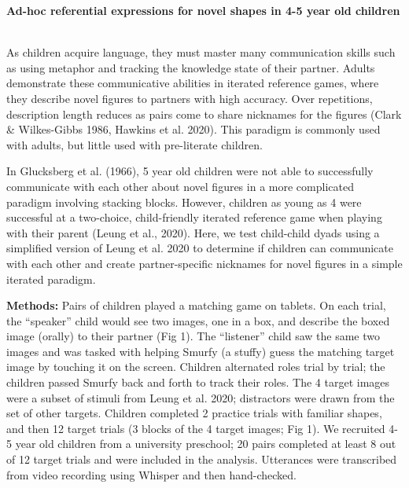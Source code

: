 \documentclass[11pt,a4paper]{article}
\renewcommand{\title}[1]{\textbf{#1}\\}
\newcommand{\authors}[1]{\iftoggle{anonymous}{\phantom{#1}}{#1}\\}
\newcommand{\email}[1]{\iftoggle{anonymous}{\phantom{#1}}{#1}}
\begin{document}


\title{Ad-hoc referential expressions for novel shapes in 4-5 year old children}
\authors{Veronica Boyce, Ilaria Chen, Bobby Sparks, Malia Perez, Michael C. Frank} 
\email{vboyce@stanford.edu;  Stanford University}
\newline
%




As children acquire language, they must master many communication skills such as using metaphor and tracking the knowledge state of their partner. Adults demonstrate these communicative abilities in iterated reference games, where they describe novel figures to partners with high accuracy. Over repetitions, description length reduces as pairs come to share nicknames for the figures (Clark \& Wilkes-Gibbs 1986, Hawkins et al. 2020). This paradigm is commonly used with adults, but little used with pre-literate children. 

In  Glucksberg et al. (1966), 5 year old children were not able to successfully communicate with each other about novel figures in a more complicated paradigm involving stacking blocks. However, children as young as 4 were successful at a two-choice, child-friendly iterated reference game when playing with their parent (Leung et al., 2020). Here, we test child-child dyads using a simplified version of Leung et al. 2020 to determine if children can communicate with each other and create partner-specific nicknames for novel figures in a simple iterated paradigm.


\textbf{Methods:} Pairs of children played a matching game on tablets. On each trial, the ``speaker'' child would see two images, one in a box, and describe the boxed image (orally) to their partner (Fig 1). The ``listener'' child saw the same two images and was tasked with helping Smurfy (a stuffy) guess the matching target image by touching it on the screen. Children alternated roles trial by trial; the children passed Smurfy back and forth to track their roles. The 4 target images were a subset of stimuli from Leung et al. 2020; distractors were drawn from the set of other targets. Children completed 2 practice trials with familiar shapes, and then 12 target trials (3 blocks of the 4 target images; Fig 1). We recruited 4-5 year old children from a university preschool; 20 pairs completed at least 8 out of 12 target trials and were included in the analysis. Utterances were transcribed from video recording using Whisper and then hand-checked. 
\end{document}
